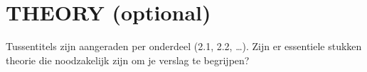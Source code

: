 \section{THEORY (optional)}
Tussentitels zijn aangeraden per onderdeel (2.1, 2.2, \dots).
Zijn er essentiele stukken theorie die noodzakelijk zijn om je verslag te begrijpen?